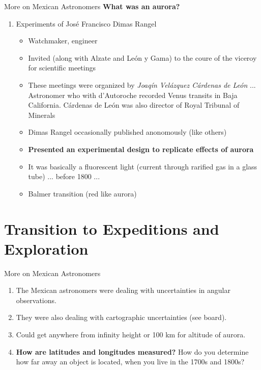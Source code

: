 \documentclass{beamer}
\begin{document}
\begin{frame}{More on Mexican Astronomers}
\small
\textbf{What was an aurora?}
\begin{enumerate}
\item Experiments of Jos\'{e} Francisco Dimas Rangel
\begin{itemize}
\item Watchmaker, engineer
\item Invited (along with Alzate and Le\'{o}n y Gama) to the coure of the viceroy for scientific meetings
\item These meetings were organized by \textit{Joaq\'{i}n Vel\'{a}zquez C\'{a}rdenas de Le\'{o}n} ... Astronomer who with d'Autoroche recorded Venus transits in Baja California. C\'{a}rdenas de Le\'{o}n was also director of Royal Tribunal of Minerals
\item Dimas Rangel occasionally published anonomously (like others)
\item \textbf{\alert{Presented an experimental design to replicate effects of aurora}}
\item It was basically a fluorescent light (current through rarified gas in a glass tube) ... before 1800 ...
\item Balmer transition (red like aurora)
\end{itemize}
\end{enumerate}
\end{frame}

\section{Transition to Expeditions and Exploration}

\begin{frame}{More on Mexican Astronomers}
\begin{enumerate}
\item The Mexican astronomers were dealing with uncertainties in angular observations.
\item They were also dealing with cartographic uncertainties (see board).
\item Could get anywhere from infinity height or 100 km for altitude of aurora.
\item \textbf{How are latitudes and longitudes measured?} How do you determine how far away an object is located, when you live in the 1700s and 1800s?
\end{enumerate}
\end{frame}
\end{document}
